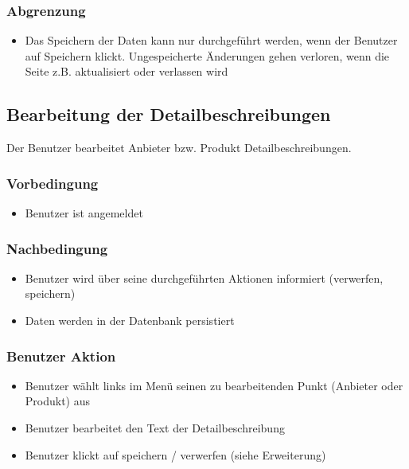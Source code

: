 \documentclass[a4paper,12pt]{article}
\begin{document}
\subsubsection{Abgrenzung}\label{abgrenzung-2}

\begin{itemize}

\item
  Das Speichern der Daten kann nur durchgeführt werden, wenn der
  Benutzer auf Speichern klickt. Ungespeicherte Änderungen gehen
  verloren, wenn die Seite z.B. aktualisiert oder verlassen wird
\end{itemize}

\clearpage

\subsection{Bearbeitung der Detailbeschreibungen}
Der Benutzer bearbeitet Anbieter bzw. Produkt Detailbeschreibungen.

\subsubsection{Vorbedingung}\label{vorbedingung-3}

\begin{itemize}

\item
  Benutzer ist angemeldet
\end{itemize}

\subsubsection{Nachbedingung}\label{nachbedingung-3}

\begin{itemize}

\item
  Benutzer wird über seine durchgeführten Aktionen informiert
  (verwerfen, speichern)
\item
  Daten werden in der Datenbank persistiert
\end{itemize}

\subsubsection{Benutzer Aktion}\label{benutzer-aktion-3}

\begin{itemize}

\item
  Benutzer wählt links im Menü seinen zu bearbeitenden Punkt (Anbieter
  oder Produkt) aus
\item
  Benutzer bearbeitet den Text der Detailbeschreibung
\item
  Benutzer klickt auf speichern / verwerfen (siehe Erweiterung)
\end{itemize}
\end{document}
